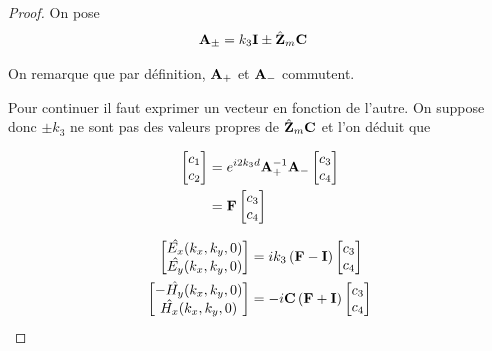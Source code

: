 \begin{proof}
            On pose
            \begin{align}
                \mathbf{A}_\pm &= k_3\mathbf{I} \pm \hat{\mathbf{Z}}_m\mathbf{C}
            \end{align}

            On remarque que par définition, \(\mathbf{A}_+\) et \(\mathbf{A}_-\) commutent.

            Pour continuer il faut exprimer un vecteur en fonction de l'autre. On suppose donc \(\pm k_3\) ne sont pas des valeurs propres de \(\hat{\mathbf{Z}}_m\mathbf{C}\) et l'on déduit que

            \begin{align}
                \begin{bmatrix}
                    c_1 \\
                    c_2
                \end{bmatrix}
                &= e^{i2 k_3 d} \mathbf{A}_+^{-1}\mathbf{A}_-
                \begin{bmatrix}
                    c_3 \\
                    c_4
                \end{bmatrix}
                \\
                & = \mathbf{F}
                \begin{bmatrix}
                    c_3 \\
                    c_4
                \end{bmatrix}
            \end{align}

            \begin{align}
                \begin{bmatrix}
                    \hat{E_x}(k_x,k_y,0)\\
                    \hat{E_y}(k_x,k_y,0)\\
                \end{bmatrix}
                &=ik_3\left(\mathbf{F} - \mathbf{I} \right)
                \begin{bmatrix}
                    c_3 \\
                    c_4
                \end{bmatrix}\\
                \begin{bmatrix}
                    -\hat{H_y}(k_x,k_y,0)\\
                    \hat{H_x}(k_x,k_y,0)\\
                \end{bmatrix}
                &=-i\mathbf{C} \left(\mathbf{F} + \mathbf{I} \right)
                \begin{bmatrix}
                        c_3 \\
                        c_4
                \end{bmatrix}
            \end{align}


\end{proof}
